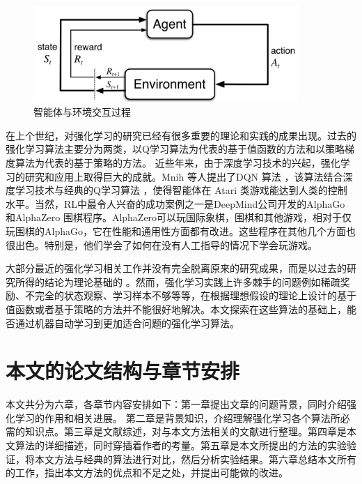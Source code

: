 \begin{figure}[h]
	\centering
	\includegraphics[width=0.9\textwidth]{image/chap01/interaction.png}
	\caption{智能体与环境交互过程\cite{suttonReinforcementLearningIntroduction2018}}
 	\label{fig:agent-env-interaction}
\end{figure}

在上个世纪，对强化学习的研究已经有很多重要的理论和实践的成果出现\cite{suttonReinforcementLearningIntroduction2018}。过去的强化学习算法主要分为两类，以Q学习算法为代表的基于值函数的方法和以策略梯度算法为代表的基于策略的方法。
近些年来，由于深度学习技术的兴起，强化学习的研究和应用上取得巨大的成就。Mnih 等人提出了DQN 算法\cite{mnihPlayingAtariDeep2013} \cite{mnihHumanlevelControlDeep2015}，该算法结合深度学习技术与经典的Q学习算法 \cite{watkinsQlearning1992}，使得智能体在 Atari 类游戏能达到人类的控制水平。当然，RL中最令人兴奋的成功案例之一是DeepMind公司开发的AlphaGo \cite{silverMasteringGameGo2016} 和AlphaZero \cite{silverMasteringGameGo2017} 围棋程序。AlphaZero可以玩国际象棋，围棋和其他游戏，相对于仅玩围棋的AlphaGo，它在性能和通用性方面都有改进。这些程序在其他几个方面也很出色。特别是，他们学会了如何在没有人工指导的情况下学会玩游戏。

大部分最近的强化学习相关工作并没有完全脱离原来的研究成果，而是以过去的研究所得的结论为理论基础的 \cite{ohDiscoveringReinforcementLearning2020}。然而，强化学习实践上许多棘手的问题例如稀疏奖励、不完全的状态观察、学习样本不够等等，在根据理想假设的理论上设计的基于值函数或者基于策略的方法并不能很好地解决。本文探索在这些算法的基础上，能否通过机器自动学习到更加适合问题的强化学习算法。


\section{本文的论文结构与章节安排}
\label{sec:arrangement}

本文共分为六章，各章节内容安排如下：第一章提出文章的问题背景，同时介绍强化学习的作用和相关进展。 第二章是背景知识，介绍理解强化学习各个算法所必需的知识点。第三章是文献综述，对与本文方法相关的文献进行整理。第四章是本文算法的详细描述，同时穿插着作者的考量。第五章是本文所提出的方法的实验验证，将本文方法与经典的算法进行对比，然后分析实验结果。第六章总结本文所有的工作，指出本文方法的优点和不足之处，并提出可能做的改进。
